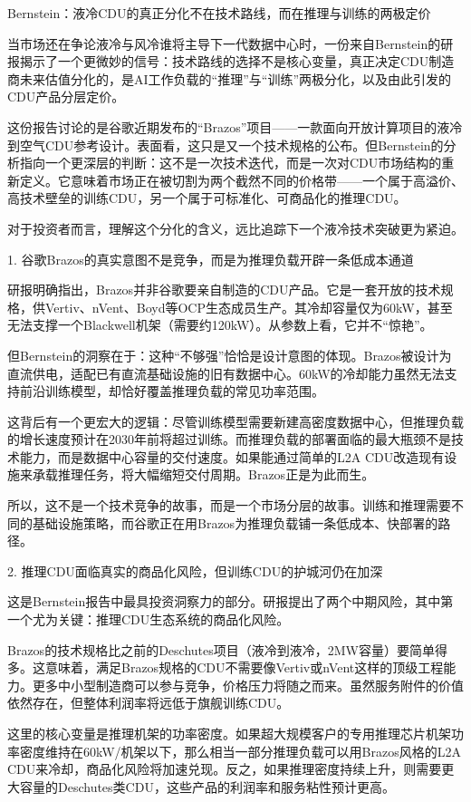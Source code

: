 \documentclass[11pt]{ctexart}
\begin{document}
Bernstein：液冷CDU的真正分化不在技术路线，而在推理与训练的两极定价

当市场还在争论液冷与风冷谁将主导下一代数据中心时，一份来自Bernstein的研报揭示了一个更微妙的信号：技术路线的选择不是核心变量，真正决定CDU制造商未来估值分化的，是AI工作负载的“推理”与“训练”两极分化，以及由此引发的CDU产品分层定价。

这份报告讨论的是谷歌近期发布的“Brazos”项目——一款面向开放计算项目的液冷到空气CDU参考设计。表面看，这只是又一个技术规格的公布。但Bernstein的分析指向一个更深层的判断：这不是一次技术迭代，而是一次对CDU市场结构的重新定义。它意味着市场正在被切割为两个截然不同的价格带——一个属于高溢价、高技术壁垒的训练CDU，另一个属于可标准化、可商品化的推理CDU。

对于投资者而言，理解这个分化的含义，远比追踪下一个液冷技术突破更为紧迫。

1. 谷歌Brazos的真实意图不是竞争，而是为推理负载开辟一条低成本通道

研报明确指出，Brazos并非谷歌要亲自制造的CDU产品。它是一套开放的技术规格，供Vertiv、nVent、Boyd等OCP生态成员生产。其冷却容量仅为60kW，甚至无法支撑一个Blackwell机架（需要约120kW）。从参数上看，它并不“惊艳”。

但Bernstein的洞察在于：这种“不够强”恰恰是设计意图的体现。Brazos被设计为直流供电，适配已有直流基础设施的旧有数据中心。60kW的冷却能力虽然无法支持前沿训练模型，却恰好覆盖推理负载的常见功率范围。

这背后有一个更宏大的逻辑：尽管训练模型需要新建高密度数据中心，但推理负载的增长速度预计在2030年前将超过训练。而推理负载的部署面临的最大瓶颈不是技术能力，而是数据中心容量的交付速度。如果能通过简单的L2A CDU改造现有设施来承载推理任务，将大幅缩短交付周期。Brazos正是为此而生。

所以，这不是一个技术竞争的故事，而是一个市场分层的故事。训练和推理需要不同的基础设施策略，而谷歌正在用Brazos为推理负载铺一条低成本、快部署的路径。

2. 推理CDU面临真实的商品化风险，但训练CDU的护城河仍在加深

这是Bernstein报告中最具投资洞察力的部分。研报提出了两个中期风险，其中第一个尤为关键：推理CDU生态系统的商品化风险。

Brazos的技术规格比之前的Deschutes项目（液冷到液冷，2MW容量）要简单得多。这意味着，满足Brazos规格的CDU不需要像Vertiv或nVent这样的顶级工程能力。更多中小型制造商可以参与竞争，价格压力将随之而来。虽然服务附件的价值依然存在，但整体利润率将远低于旗舰训练CDU。

这里的核心变量是推理机架的功率密度。如果超大规模客户的专用推理芯片机架功率密度维持在60kW/机架以下，那么相当一部分推理负载可以用Brazos风格的L2A CDU来冷却，商品化风险将加速兑现。反之，如果推理密度持续上升，则需要更大容量的Deschutes类CDU，这些产品的利润率和服务粘性预计更高。
\end{document}
